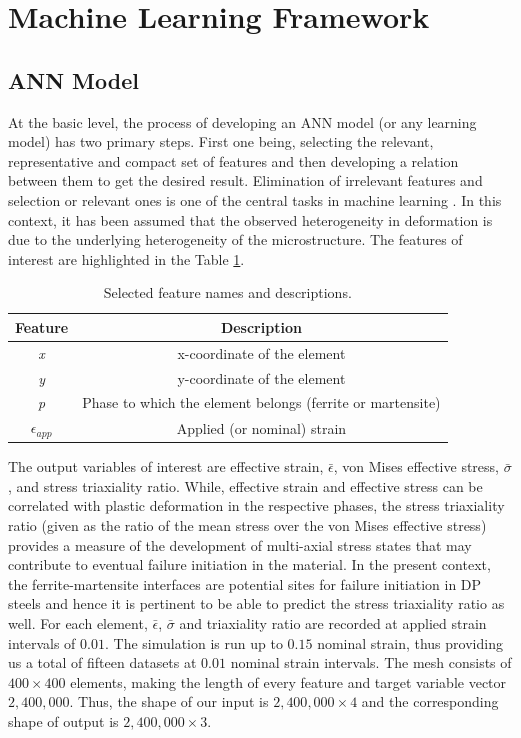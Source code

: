 \section{Machine Learning Framework}
\subsection{ANN Model}
At the basic level, the process of developing an ANN model (or any learning model) has two primary steps. First one being, selecting the relevant, representative and compact set of  features and then developing a relation between them to get the desired result. Elimination of irrelevant features and selection or relevant ones is one of the central tasks in machine learning \cite{blum1997selection}. In this context, it has been assumed that the observed heterogeneity in deformation is due to the underlying heterogeneity of the microstructure. The features of interest are highlighted in the Table \ref{tab:feature-table}. 
\begin{table}
\begin{center}
\begin{tabular}{|c|c|}
\hline
Feature & Description \\
\hline
\textit{x} & x-coordinate of the element \\
\hline
\textit{y} & y-coordinate of the element \\
\hline
\textit{p} & Phase to which the element belongs (ferrite or martensite) \\
\hline
\begin{math}{\epsilon_{app}}\end{math}& Applied (or nominal) strain \\
\hline
\end{tabular}
\end{center}
\caption{\label{tab:feature-table}Selected feature names and descriptions.}
\end{table}

The output variables of interest are effective strain, ${\bar{\epsilon}}$, von Mises effective stress, $\bar{\sigma}$, and stress triaxiality ratio. While, effective strain and effective stress can be correlated with plastic deformation in the respective phases, the stress triaxiality ratio (given as the ratio of the mean stress over the von Mises effective stress) provides a measure of the development of multi-axial stress states that may contribute to eventual failure initiation in the material. In the present context, the ferrite-martensite interfaces are potential sites for failure initiation in DP steels and hence it is pertinent to be able to predict the stress triaxiality ratio as well. For each element, ${\bar{\epsilon}}$, $\bar{\sigma}$ and triaxiality ratio are recorded at applied strain intervals of $0.01$. The simulation is run up to $0.15$ nominal strain, thus providing us a total of fifteen datasets at $0.01$ nominal strain intervals. The mesh consists of $400\times400$ elements, making the length of every feature and target variable vector $2,400,000$. Thus, the shape of our input is $2,400,000\times4$ and the corresponding shape of output is $2,400,000\times3$. 

